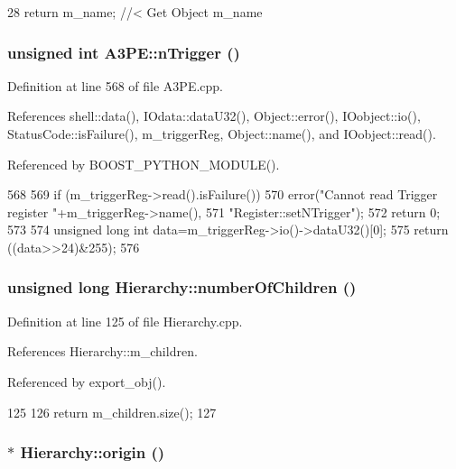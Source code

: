 \begin{DoxyCode}
28 { return m_name; } //< Get Object m_name
\end{DoxyCode}
\hypertarget{classA3PE_a3398fa3ce59a4b1b946e7b4ab4912580}{
\subsubsection[{nTrigger}]{\setlength{\rightskip}{0pt plus 5cm}unsigned int A3PE::nTrigger ()}}
\label{classA3PE_a3398fa3ce59a4b1b946e7b4ab4912580}


Definition at line 568 of file A3PE.cpp.

References shell::data(), IOdata::dataU32(), Object::error(), IOobject::io(), StatusCode::isFailure(), m\_\-triggerReg, Object::name(), and IOobject::read().

Referenced by BOOST\_\-PYTHON\_\-MODULE().


\begin{DoxyCode}
568                            {
569   if (m_triggerReg->read().isFailure()){
570     error("Cannot read Trigger register "+m_triggerReg->name(),
571         "Register::setNTrigger");
572     return 0;
573   }
574   unsigned long int data=m_triggerReg->io()->dataU32()[0];
575   return ((data>>24)&255);
576 }
\end{DoxyCode}
\hypertarget{classHierarchy_ab16e84de65fd84e14001a6cf941c8be4}{
\subsubsection[{numberOfChildren}]{\setlength{\rightskip}{0pt plus 5cm}unsigned long Hierarchy::numberOfChildren ()}}
\label{classHierarchy_ab16e84de65fd84e14001a6cf941c8be4}


Definition at line 125 of file Hierarchy.cpp.

References Hierarchy::m\_\-children.

Referenced by export\_\-obj().


\begin{DoxyCode}
125                                            {
126   return m_children.size();
127 }
\end{DoxyCode}
\hypertarget{classHierarchy_aee461dc930ce3871636ff87f075b1b83}{
\subsubsection[{origin}]{$\ast$ Hierarchy::origin ()}}
\label{classHierarchy_aee461dc930ce3871636ff87f075b1b83}


